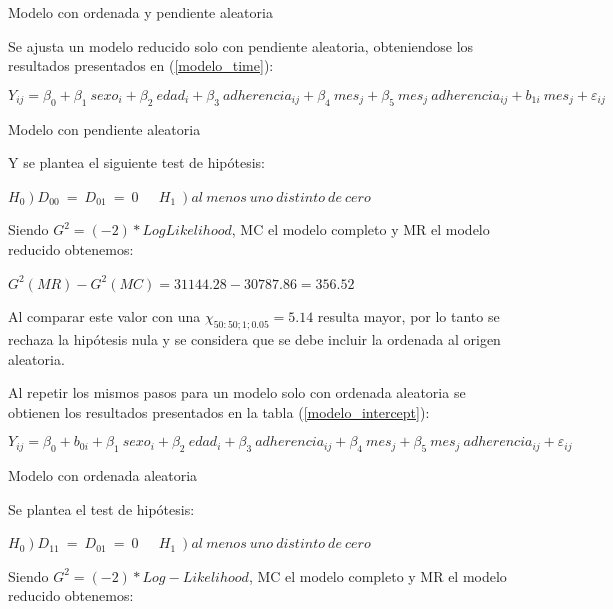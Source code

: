 \documentclass[spanish]{article}
\numberwithin{figure}{subsection}
\numberwithin{equation}{subsection}
\numberwithin{table}{subsection}
\begin{document}
\begin{table}[H]
	\centering
	\caption{Modelo con ordenada y pendiente aleatoria}
	\label{modelo_both}
	
\end{table}

Se ajusta un modelo reducido solo con pendiente aleatoria, obteniendose los
resultados presentados en (\ref{modelo_time}):

\[
	Y_{ij} = \beta_0 + \beta_1\ sexo_i + \beta_2\ edad_i + \beta_3\ adherencia_{ij}
	+ \beta_4\ mes_j + \beta_5\ mes_j\ adherencia_{ij} + b_{1i}\ mes_j + \varepsilon_{ij}
\]

\begin{table}[H]
	\centering
	\caption{Modelo con pendiente aleatoria}
	\label{modelo_time}
	
\end{table}

Y se plantea el siguiente test de hipótesis:

$ \left. H_0 \right) D_{00}\ =\ D_{01}\ =\ 0\ \quad\ \left. H_1\ \right) al\ menos\ uno\ distinto\ de\ cero $

Siendo $G^2 = (-2)*LogLikelihood$, MC el modelo completo y MR el modelo
reducido obtenemos:

$ G^2(MR) - G^2(MC) = 31144.28 - 30787.86 = 356.52 $

Al comparar este valor con una $\chi_{50:50;1;0.05} = 5.14$ resulta mayor, por
lo tanto se rechaza la hipótesis nula y se considera que se debe incluir la
ordenada al origen aleatoria.

Al repetir los mismos pasos para un modelo solo con ordenada aleatoria se
obtienen los resultados presentados en la tabla (\ref{modelo_intercept}):

\[
	Y_{ij} = \beta_0 + b_{0i} + \beta_1\ sexo_i + \beta_2\ edad_i + \beta_3\ adherencia_{ij}
	+ \beta_4\ mes_j + \beta_5\ mes_j\ adherencia_{ij} + \varepsilon_{ij}
\]

\begin{table}[H]
	\centering
	\caption{Modelo con ordenada aleatoria}
	\label{modelo_intercept}
	
\end{table}

Se plantea el test de hipótesis:

$ \left. H_0 \right) D_{11}\ =\ D_{01}\ =\ 0\ \quad\ \left. H_1\ \right) al\ menos\ uno\ distinto\ de\ cero $

Siendo $G^2 = (-2)*Log-Likelihood$, MC el modelo completo y MR el modelo
reducido obtenemos:
\end{document}
